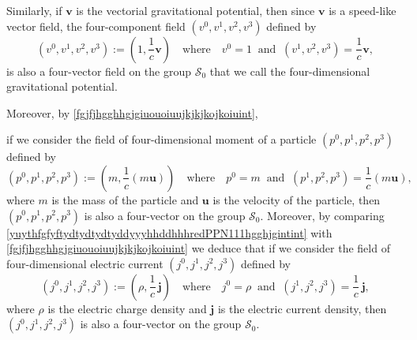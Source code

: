 \documentclass{article}
\theoremstyle{definition}
\theoremstyle{remark}
\renewcommand{\vec}[1]{\mathbf{#1}}
\newcommand{\er}{\eqref}
\newcommand{\er}{\eqref}
\begin{document}
 Similarly, if $\vec v$ is the vectorial gravitational
potential, then since $\vec v$ is a speed-like vector field, the
four-component field $(v^0,v^1,v^2,v^3)$ defined by
\begin{equation}\label{fgjfjhgghhgjghjhjijhojihjhjjijhjjjjjuiijjjkint}
(v^0,v^1,v^2,v^3):=\left(1,\frac{1}{c}\vec
v\right)\quad\text{where}\quad
v^0=1\;\;\text{and}\;\;(v^1,v^2,v^3)=\frac{1}{c}\vec v,
\end{equation}
is also a four-vector field on the group $\mathcal{S}_0$ that we
call the four-dimensional gravitational potential.

Moreover, by \er{fgjfjhgghhgjgiuouoiuujkjkjkojkoiuint},
%
%
%
\begin{comment}
for every speed-like vector field $\vec u$ and every proper scalar
field $\sigma$ the four-component field $(b^0,b^1,b^2,b^3)$ defined
by
\begin{equation}\label{fgjfjhgghhgjghjhjijhojihjhjjijhjjjjjuiijjjklint}
(b^0,b^1,b^2,b^3):=\left(\sigma,\frac{\sigma}{c}\vec
u\right)\quad\text{where}\quad
b^0=\sigma\;\;\text{and}\;\;(b^1,b^2,b^3)=\frac{\sigma}{c}\vec u,
\end{equation}
is also a four-vector field on the group $\mathcal{S}_0$. In
particular,
\end{comment}
%
%
%
if we consider the field of four-dimensional moment of a particle
$(p^0,p^1,p^2,p^3)$ defined by
\begin{equation}\label{fgjfjhgghhgjghjhjijhojihjhjjijhjjjjjuiijjjklihhint}
(p^0,p^1,p^2,p^3):=\left(m,\frac{1}{c}(m\vec
u)\right)\quad\text{where}\quad
p^0=m\;\;\text{and}\;\;(p^1,p^2,p^3)=\frac{1}{c}(m\vec u),
\end{equation}
where $m$ is the mass of the particle and $\vec u$ is the velocity
of the particle, then $(p^0,p^1,p^2,p^3)$ is also a four-vector on
the group $\mathcal{S}_0$. Moreover, by comparing
\er{yuythfgfyftydtydtydtyddyyyhhddhhhredPPN111hgghjgintint}
with
\er{fgjfjhgghhgjgiuouoiuujkjkjkojkoiuint} we deduce that if we
consider the field of four-dimensional electric current
$(j^0,j^1,j^2,j^3)$ defined by
\begin{equation}\label{fgjfjhgghhgjghjhjijhojihjhjjijhjjjjjuiijjjklihhojjjoint}
(j^0,j^1,j^2,j^3):=\left(\rho,\frac{1}{c}\,\vec
j\right)\quad\text{where}\quad
j^0=\rho\;\;\text{and}\;\;(j^1,j^2,j^3)=\frac{1}{c}\,\vec j,
\end{equation}
where $\rho$ is the electric charge density and $\vec j$ is the
electric current density, then $(j^0,j^1,j^2,j^3)$ is also a
four-vector on the group $\mathcal{S}_0$.
\end{document}
